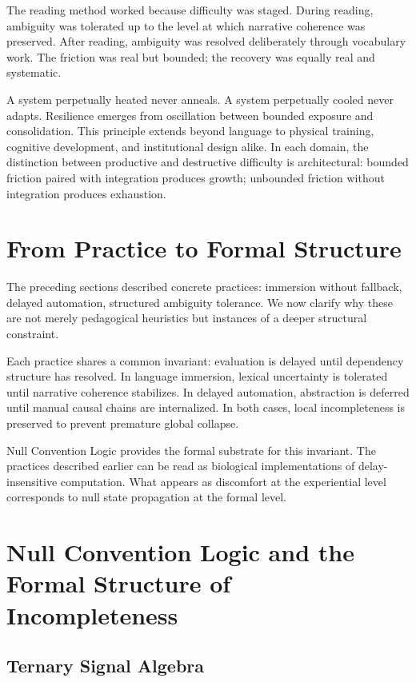\documentclass[11pt]{article}
\theoremstyle{remark}
\begin{document}
The reading method worked because difficulty was staged. During reading, ambiguity was tolerated up to the level at which narrative coherence was preserved. After reading, ambiguity was resolved deliberately through vocabulary work. The friction was real but bounded; the recovery was equally real and systematic.

A system perpetually heated never anneals. A system perpetually cooled never adapts. Resilience emerges from oscillation between bounded exposure and consolidation. This principle extends beyond language to physical training, cognitive development, and institutional design alike. In each domain, the distinction between productive and destructive difficulty is architectural: bounded friction paired with integration produces growth; unbounded friction without integration produces exhaustion.


\section{From Practice to Formal Structure}
\label{sec:bridge_practice}

The preceding sections described concrete practices: immersion without fallback, delayed automation, structured ambiguity tolerance. We now clarify why these are not merely pedagogical heuristics but instances of a deeper structural constraint.

Each practice shares a common invariant: evaluation is delayed until dependency structure has resolved. In language immersion, lexical uncertainty is tolerated until narrative coherence stabilizes. In delayed automation, abstraction is deferred until manual causal chains are internalized. In both cases, local incompleteness is preserved to prevent premature global collapse.

Null Convention Logic provides the formal substrate for this invariant. The practices described earlier can be read as biological implementations of delay-insensitive computation. What appears as discomfort at the experiential level corresponds to null state propagation at the formal level.

\section{Null Convention Logic and the Formal Structure of Incompleteness}
\label{sec:ncl}

\subsection{Ternary Signal Algebra}
\end{document}
